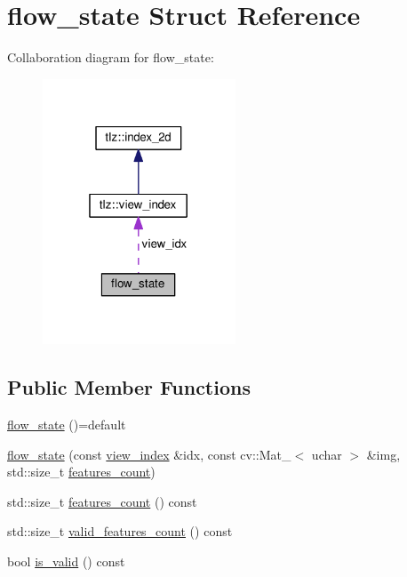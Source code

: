 \hypertarget{structflow__state}{}\section{flow\+\_\+state Struct Reference}
\label{structflow__state}


Collaboration diagram for flow\+\_\+state\+:
\nopagebreak
\begin{figure}[H]
\begin{center}
\leavevmode
\includegraphics[width=163pt]{structflow__state__coll__graph}
\end{center}
\end{figure}
\subsection*{Public Member Functions}
\begin{DoxyCompactItemize}
\item 
\hyperlink{structflow__state_a7f44e3a4701be71718b470f0f133dce5}{flow\+\_\+state} ()=default
\item 
\hyperlink{structflow__state_a9cca42e1283a846ee639d3f9fd0569ff}{flow\+\_\+state} (const \hyperlink{structtlz_1_1view__index}{view\+\_\+index} \&idx, const cv\+::\+Mat\+\_\+$<$ uchar $>$ \&img, std\+::size\+\_\+t \hyperlink{structflow__state_a04a62f8006f54b559ef6fcc25b87e66b}{features\+\_\+count})
\item 
std\+::size\+\_\+t \hyperlink{structflow__state_a04a62f8006f54b559ef6fcc25b87e66b}{features\+\_\+count} () const 
\item 
std\+::size\+\_\+t \hyperlink{structflow__state_a70ebb1f3987cbd90e1fd2666a0b68cf5}{valid\+\_\+features\+\_\+count} () const 
\item 
bool \hyperlink{structflow__state_ac8be37941073fba44d3bd34de142a9e4}{is\+\_\+valid} () const 
\end{DoxyCompactItemize}

